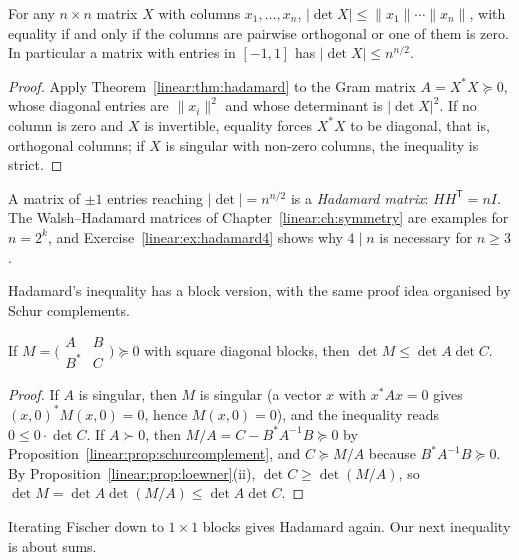 \begin{corollary}\label{linear:cor:hadamardvol}
For any $n\times n$ matrix $X$ with columns $x_1,\dots,x_n$, $|\det X|\le\|x_1\|\cdots\|x_n\|$, with equality if and only if the
columns are pairwise orthogonal or one of them is zero. In particular a matrix with entries in $[-1,1]$ has $|\det X|\le n^{n/2}$.
\end{corollary}
\begin{proof}
Apply Theorem~\ref{linear:thm:hadamard} to the Gram matrix $A=X^*X\succeq0$, whose diagonal entries are $\|x_i\|^2$ and whose determinant is
$|\det X|^2$. If no column is zero and $X$ is invertible, equality forces $X^*X$ to be diagonal, that is, orthogonal columns; if $X$ is
singular with non-zero columns, the inequality is strict.
\end{proof}

A matrix of $\pm1$ entries reaching $|\det|=n^{n/2}$ is a \emph{Hadamard matrix}: $HH^{\mathsf T}=nI$. The Walsh--Hadamard matrices of
Chapter~\ref{linear:ch:symmetry} are examples for $n=2^k$, and Exercise~\ref{linear:ex:hadamard4} shows why $4\mid n$ is necessary for $n\ge3$.

Hadamard's inequality has a block version, with the same proof idea organised by Schur complements.

\begin{theorem}\label{linear:thm:fischer}
If $M=\bigl(\begin{smallmatrix}A&B\\B^*&C\end{smallmatrix}\bigr)\succeq0$ with square diagonal blocks, then $\det M\le\det A\det C$.
\end{theorem}
\begin{proof}
If $A$ is singular, then $M$ is singular (a vector $x$ with $x^*Ax=0$ gives $(x,0)^*M(x,0)=0$, hence $M(x,0)=0$), and the inequality
reads $0\le0\cdot\det C$. If $A\succ0$, then $M/A=C-B^*A^{-1}B\succeq0$ by Proposition~\ref{linear:prop:schurcomplement}, and $C\succeq M/A$
because $B^*A^{-1}B\succeq0$. By Proposition~\ref{linear:prop:loewner}(ii), $\det C\ge\det(M/A)$, so $\det M=\det A\det(M/A)\le\det A\det C$.
\end{proof}

Iterating Fischer down to $1\times1$ blocks gives Hadamard again. Our next inequality is about sums.

